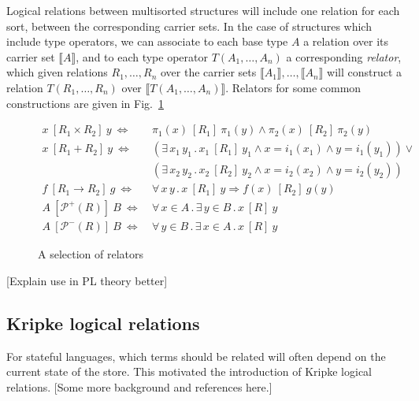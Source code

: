 \documentclass[acmsmall,anonymous]{acmart}
\newcommand{\ifr}[1]{\ [{#1}]\ }
\begin{document}
Logical relations between multisorted structures
will include one relation for each sort,
between the corresponding carrier sets.
In the case of structures which include type operators,
we can associate to each base type $A$
a relation over its carrier set $\llbracket A \rrbracket$,
and to each type operator $T(A_1, \ldots, A_n)$
a corresponding \emph{relator},
which given relations $R_1, \ldots, R_n$ over
the carrier sets $\llbracket A_1 \rrbracket, \ldots, \llbracket A_n \rrbracket$
will construct a relation $T(R_1, \ldots, R_n)$
over $\llbracket T(A_1, \ldots, A_n) \rrbracket$.
Relators for some common constructions are given in Fig.~\ref{fig:relators}

\begin{figure}
  \begin{align*}
    x \ifr{R_1 \times R_2} y \ \Leftrightarrow\  &
      \pi_1(x) \ifr{R_1} \pi_1(y) \wedge
      \pi_2(x) \ifr{R_2} \pi_2(y) \\
    x \ifr{R_1 + R_2} y \ \Leftrightarrow\  &
      (\exists \, x_1 \, y_1 \,.\,
        x_1 \ifr{R_1} y_1 \wedge
        x = i_1(x_1) \wedge
        y = i_1(y_1)) \vee \\ &
      (\exists \, x_2 \, y_2 \,.\,
        x_2 \ifr{R_2} y_2 \wedge
        x = i_2(x_2) \wedge
        y = i_2(y_2)) \\
    f \ifr{R_1 \rightarrow R_2} g \ \Leftrightarrow\  &
      \forall \, x \, y \,.\,
        x \ifr{R_1} y \Rightarrow
        f(x) \ifr{R_2} g(y) \\
    A \ifr{\mathcal{P}^+(R)} B \ \Leftrightarrow\  &
      \forall \, x \in A \,.\,
      \exists \, y \in B \,.\,
      x \ifr{R} y \\
    A \ifr{\mathcal{P}^-(R)} B \ \Leftrightarrow\  &
      \forall \, y \in B \,.\,
      \exists \, x \in A \,.\,
      x \ifr{R} y
  \end{align*}
  \caption{A selection of relators}
  \label{fig:relators}
\end{figure}

[Explain use in PL theory better]


\subsection{Kripke logical relations} %

For stateful languages,
which terms should be related
will often depend on the current state of the store.
This motivated the introduction of Kripke logical relations.
[Some more background and references here.]
\end{document}
